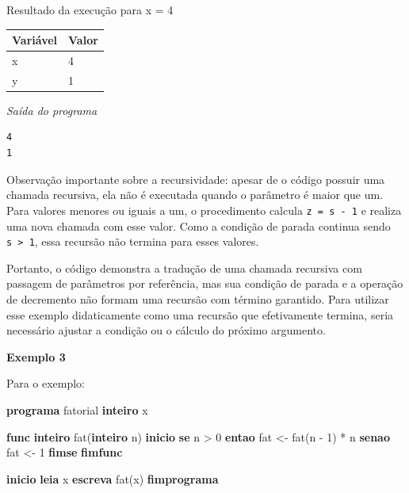 \documentclass[
  brazilian,
  letterpaper,
]{book}
\newenvironment{Shaded}{\begin{snugshade}}{\end{snugshade}}
\newcommand{\DecValTok}[1]{\textcolor[rgb]{0.68,0.00,0.00}{#1}}
\newcommand{\KeywordTok}[1]{\textcolor[rgb]{0.00,0.23,0.31}{\textbf{#1}}}
\newcommand{\NormalTok}[1]{\textcolor[rgb]{0.00,0.23,0.31}{#1}}
\theoremstyle{plain}
\theoremstyle{definition}
\theoremstyle{remark}
\begin{document}
Resultado da execução para x = 4

\begin{longtable*}[]{|l|l|}
\toprule\noalign{}
Variável & Valor \\
\midrule\noalign{}
\endhead
\bottomrule\noalign{}
\endlastfoot
x & 4 \\
\midrule
y & 1 \\
\end{longtable*}

\emph{Saída do programa}

\begin{verbatim}
4
1
\end{verbatim}

Observação importante sobre a recursividade: apesar de o código possuir
uma chamada recursiva, ela não é executada quando o parâmetro é maior
que um. Para valores menores ou iguais a um, o procedimento calcula
\texttt{z\ =\ s\ -\ 1} e realiza uma nova chamada com esse valor. Como a
condição de parada continua sendo \texttt{s\ \textgreater{}\ 1}, essa
recursão não termina para esses valores.

Portanto, o código demonstra a tradução de uma chamada recursiva com
passagem de parâmetros por referência, mas sua condição de parada e a
operação de decremento não formam uma recursão com término garantido.
Para utilizar esse exemplo didaticamente como uma recursão que
efetivamente termina, seria necessário ajustar a condição ou o cálculo
do próximo argumento.

\textbf{Exemplo 3}

Para o exemplo:

\begin{Shaded}
\begin{Highlighting}[]
\KeywordTok{programa}\NormalTok{ fatorial}
  \KeywordTok{inteiro}\NormalTok{ x}

  \KeywordTok{func} \KeywordTok{inteiro}\NormalTok{ fat(}\KeywordTok{inteiro}\NormalTok{ n)}
  \KeywordTok{inicio}
     \KeywordTok{se}\NormalTok{ n \textgreater{} }\DecValTok{0}
        \KeywordTok{entao}\NormalTok{ fat \textless{}{-} fat(n {-} }\DecValTok{1}\NormalTok{) * n}
        \KeywordTok{senao}\NormalTok{ fat \textless{}{-} }\DecValTok{1}
     \KeywordTok{fimse}
  \KeywordTok{fimfunc}

\KeywordTok{inicio}
   \KeywordTok{leia}\NormalTok{ x}
   \KeywordTok{escreva}\NormalTok{ fat(x)}
\KeywordTok{fimprograma}
\end{Highlighting}
\end{Shaded}
\end{document}
